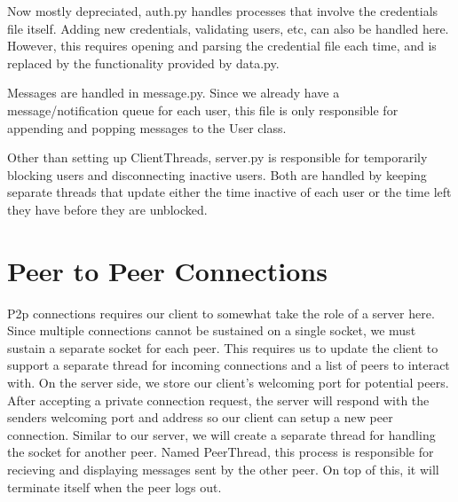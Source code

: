 \documentclass[12pt, ]{article}
\begin{document}
\begin{flushleft}
	Now mostly depreciated, auth.py handles processes that involve the credentials file itself. Adding new credentials, validating users, etc, can also be handled here. 
	However, this requires opening and parsing the credential file each time, and is replaced by the functionality provided by data.py.
\end{flushleft}

\begin{flushleft}
	Messages are handled in message.py. Since we already have a message/notification queue for each user, this file is only responsible for appending and popping messages to the User class.
\end{flushleft}

\begin{flushleft}
	Other than setting up ClientThreads, server.py is responsible for temporarily blocking users and disconnecting inactive users. 
	Both are handled by keeping separate threads that update either the time inactive of each user or the time left they have before they are unblocked.
\end{flushleft}

\newpage

\maketitle
\section{Peer to Peer Connections}

\begin{flushleft}
	P2p connections requires our client to somewhat take the role of a server here. Since multiple connections cannot be sustained on a single socket, we must sustain a separate socket for each peer.
	This requires us to update the client to support a separate thread for incoming connections and a list of peers to interact with. On the server side, we store our client's welcoming port for potential peers.
	After accepting a private connection request, the server will respond with the senders welcoming port and address so our client can setup a new peer connection. 
	Similar to our server, we will create a separate thread for handling the socket for another peer. Named PeerThread, this process is responsible for recieving and displaying messages sent by the other peer.
	On top of this, it will terminate itself when the peer logs out.
\end{flushleft}
\end{document}
